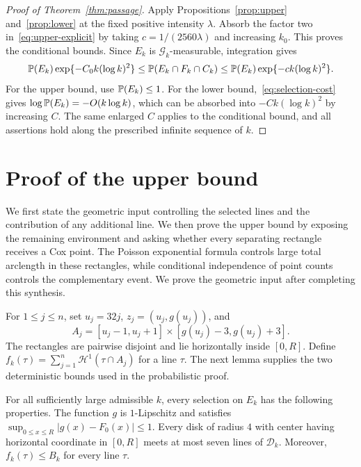 \documentclass[11pt,letterpaper]{article}
\begin{document}
\begin{proof}[Proof of Theorem~\ref{thm:passage}]
Apply Propositions~\ref{prop:upper} and~\ref{prop:lower} at the fixed positive intensity $\lambda$. Absorb the factor two in~\eqref{eq:upper-explicit} by taking $c=1/(2560\lambda)$ and increasing $k_0$. This proves the conditional bounds. Since $E_k$ is $\mathcal G_k$-measurable, integration gives
\[
 \P(E_k)\exp\{-C_0k(\log k)^2\}
 \le\P(E_k\cap F_k\cap C_k)
 \le\P(E_k)\exp\{-ck(\log k)^2\}.
\]
For the upper bound, use $\P(E_k)\le1$. For the lower bound,~\eqref{eq:selection-cost} gives $\log\P(E_k)=-O(k\log k)$, which can be absorbed into $-Ck(\log k)^2$ by increasing $C$. The same enlarged $C$ applies to the conditional bound, and all assertions hold along the prescribed infinite sequence of $k$.
\end{proof}

\section{Proof of the upper bound}

We first state the geometric input controlling the selected lines and the contribution of any additional line. We then prove the upper bound by exposing the remaining environment and asking whether every separating rectangle receives a Cox point. The Poisson exponential formula controls large total arclength in these rectangles, while conditional independence of point counts controls the complementary event. We prove the geometric input after completing this synthesis.

For $1\le j\le n$, set $u_j=32j$, $z_j=(u_j,g(u_j))$, and
\[
 A_j=[u_j-1,u_j+1]\times[g(u_j)-3,g(u_j)+3].
\]
The rectangles are pairwise disjoint and lie horizontally inside $[0,R]$. Define $f_k(\tau)=\sum_{j=1}^n\mathcal H^1(\tau\cap A_j)$ for a line $\tau$. The next lemma supplies the two deterministic bounds used in the probabilistic proof.

\begin{lemma}\label{lem:geometry}
For all sufficiently large admissible $k$, every selection on $E_k$ has the following properties. The function $g$ is $1$-Lipschitz and satisfies $\sup_{0\le x\le R}|g(x)-F_0(x)|\le1$. Every disk of radius $4$ with center having horizontal coordinate in $[0,R]$ meets at most seven lines of $\mathcal D_k$. Moreover, $f_k(\tau)\le B_k$ for every line $\tau$.
\end{lemma}
\end{document}
